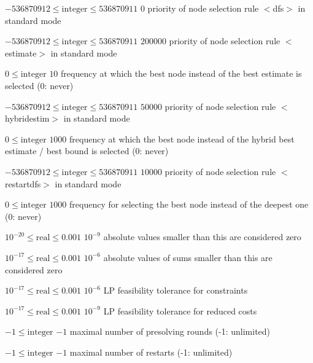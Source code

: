 %
{$-536870912\leq\textrm{integer}\leq536870911$}%
{$0$}%
{priority of node selection rule $<$dfs$>$ in standard mode}%
{}

%
{$-536870912\leq\textrm{integer}\leq536870911$}%
{$200000$}%
{priority of node selection rule $<$estimate$>$ in standard mode}%
{}

%
{$0\leq\textrm{integer}$}%
{$10$}%
{frequency at which the best node instead of the best estimate is selected (0: never)}%
{}

%
{$-536870912\leq\textrm{integer}\leq536870911$}%
{$50000$}%
{priority of node selection rule $<$hybridestim$>$ in standard mode}%
{}

%
{$0\leq\textrm{integer}$}%
{$1000$}%
{frequency at which the best node instead of the hybrid best estimate / best bound is selected (0: never)}%
{}

%
{$-536870912\leq\textrm{integer}\leq536870911$}%
{$10000$}%
{priority of node selection rule $<$restartdfs$>$ in standard mode}%
{}

%
{$0\leq\textrm{integer}$}%
{$1000$}%
{frequency for selecting the best node instead of the deepest one (0: never)}%
{}

%
{$10^{-20}\leq\textrm{real}\leq0.001$}%
{$10^{- 9}$}%
{absolute values smaller than this are considered zero}%
{}

%
{$10^{-17}\leq\textrm{real}\leq0.001$}%
{$10^{- 6}$}%
{absolute values of sums smaller than this are considered zero}%
{}

%
{$10^{-17}\leq\textrm{real}\leq0.001$}%
{$10^{- 6}$}%
{LP feasibility tolerance for constraints}%
{}

%
{$10^{-17}\leq\textrm{real}\leq0.001$}%
{$10^{- 9}$}%
{LP feasibility tolerance for reduced costs}%
{}

%
{$-1\leq\textrm{integer}$}%
{$-1$}%
{maximal number of presolving rounds (-1: unlimited)}%
{}

%
{$-1\leq\textrm{integer}$}%
{$-1$}%
{maximal number of restarts (-1: unlimited)}%
{}

